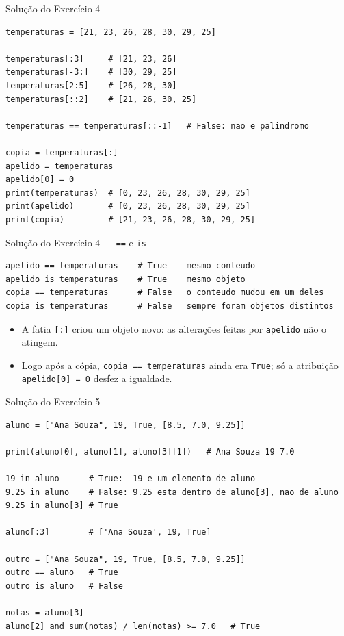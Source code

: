 \documentclass[aspectratio=169]{beamer}
\begin{document}
\begin{frame}[fragile]{Solução do Exercício 4}
\begin{lstlisting}
temperaturas = [21, 23, 26, 28, 30, 29, 25]

temperaturas[:3]     # [21, 23, 26]
temperaturas[-3:]    # [30, 29, 25]
temperaturas[2:5]    # [26, 28, 30]
temperaturas[::2]    # [21, 26, 30, 25]

temperaturas == temperaturas[::-1]   # False: nao e palindromo

copia = temperaturas[:]
apelido = temperaturas
apelido[0] = 0
print(temperaturas)  # [0, 23, 26, 28, 30, 29, 25]
print(apelido)       # [0, 23, 26, 28, 30, 29, 25]
print(copia)         # [21, 23, 26, 28, 30, 29, 25]
\end{lstlisting}
\end{frame}

\begin{frame}[fragile]{Solução do Exercício 4 --- \texttt{==} e \texttt{is}}
\begin{lstlisting}
apelido == temperaturas    # True    mesmo conteudo
apelido is temperaturas    # True    mesmo objeto
copia == temperaturas      # False   o conteudo mudou em um deles
copia is temperaturas      # False   sempre foram objetos distintos
\end{lstlisting}

\begin{itemize}
  \item A fatia \texttt{[:]} criou um objeto novo: as alterações feitas por \texttt{apelido} não o atingem.
  \item Logo após a cópia, \texttt{copia == temperaturas} ainda era \texttt{True}; só a atribuição \texttt{apelido[0] = 0} desfez a igualdade.
\end{itemize}
\end{frame}

\begin{frame}[fragile]{Solução do Exercício 5}
\begin{lstlisting}
aluno = ["Ana Souza", 19, True, [8.5, 7.0, 9.25]]

print(aluno[0], aluno[1], aluno[3][1])   # Ana Souza 19 7.0

19 in aluno      # True:  19 e um elemento de aluno
9.25 in aluno    # False: 9.25 esta dentro de aluno[3], nao de aluno
9.25 in aluno[3] # True

aluno[:3]        # ['Ana Souza', 19, True]

outro = ["Ana Souza", 19, True, [8.5, 7.0, 9.25]]
outro == aluno   # True
outro is aluno   # False

notas = aluno[3]
aluno[2] and sum(notas) / len(notas) >= 7.0   # True
\end{lstlisting}
\end{frame}
\end{document}
